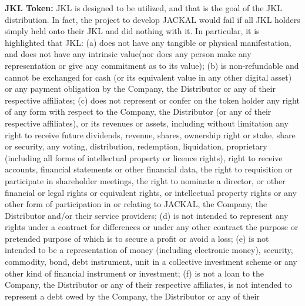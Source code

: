 \documentclass[11pt, nofootinbib]{article}
\begin{document}
{\textbf{JKL Token:} JKL is designed to be utilized, and that is the goal of the JKL distribution. In fact, the project to develop JACKAL would fail if all JKL holders simply held onto their
JKL and did nothing with it. In particular, it is highlighted that JKL:\newline\newline
(a) does not have any tangible or physical manifestation, and does not have any intrinsic value(nor does any person make any representation or give any commitment as to its
value);\newline\newline
(b) is non-refundable and cannot be exchanged for cash (or its equivalent value in any other digital asset) or any payment obligation by the Company, the Distributor or any of
their respective affiliates;\newline\newline
(c) does not represent or confer on the token holder any right of any form with respect to the Company, the Distributor (or any of their respective affiliates), or its revenues or
assets, including without limitation any right to receive future dividends, revenue, shares, ownership right or stake, share or security, any voting, distribution, redemption,
liquidation, proprietary (including all forms of intellectual property or licence rights), right to receive accounts, financial statements or other financial data, the right to requisition
or participate in shareholder meetings, the right to nominate a director, or other financial or legal rights or equivalent rights, or intellectual property rights or any other form of
participation in or relating to JACKAL, the Company, the Distributor and/or their service providers;\newline\newline
(d) is not intended to represent any rights under a contract for differences or under any other contract the purpose or pretended purpose of which is to secure a profit or avoid
a loss;\newline\newline
(e) is not intended to be a representation of money (including electronic money), security, commodity, bond, debt instrument, unit in a collective investment scheme or any
other kind of financial instrument or investment;\newline\newline
(f) is not a loan to the Company, the Distributor or any of their respective affiliates, is not intended to represent a debt owed by the Company, the Distributor or any of their
}
\end{document}
